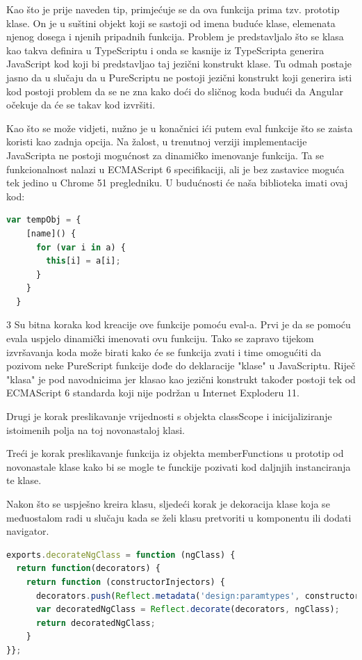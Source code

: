 \documentclass[times, utf8, zavrsni]{fer}
\begin{document}
Kao što je prije naveden tip, primjećuje se da ova funkcija prima tzv. prototip klase. On je u suštini objekt koji se sastoji od imena buduće klase, elemenata njenog dosega i njenih pripadnih funkcija. Problem je predstavljalo što se klasa kao takva definira u TypeScriptu i onda se kasnije iz TypeScripta generira JavaScript kod koji bi predstavljao taj jezični konstrukt klase. Tu odmah postaje jasno da u slučaju da u PureScriptu ne postoji jezični konstrukt koji generira isti kod postoji problem da se ne zna kako doći do sličnog koda budući da Angular očekuje da će se takav kod izvršiti.

Kao što se može vidjeti, nužno je u konačnici ići putem eval funkcije što se zaista koristi kao zadnja opcija. Na žalost, u trenutnoj verziji implementacije JavaScripta ne postoji mogućnost za dinamičko imenovanje funkcija. Ta se funkcionalnost nalazi u ECMAScript 6 specifikaciji, ali je bez zastavice moguća tek jedino u Chrome 51 pregledniku. U budućnosti će naša biblioteka imati ovaj kod:

\begin{lstlisting}[language=JavaScript, basicstyle=\small\linespread{0.8}]
var tempObj = {
    [name]() {
      for (var i in a) {
        this[i] = a[i];
      }
    }
  }
\end{lstlisting}

3 Su bitna koraka kod kreacije ove funkcije pomoću eval-a. Prvi je da se pomoću evala uspjelo dinamički imenovati ovu funkciju. Tako se zapravo tijekom izvršavanja koda može birati kako će se funkcija zvati i time omogućiti da pozivom neke PureScript funkcije dođe do deklaracije "klase" u JavaScriptu. Riječ "klasa" je pod navodnicima jer klasao kao jezični konstrukt također postoji tek od ECMAScript 6 standarda koji nije podržan u Internet Exploderu 11. 

Drugi je korak preslikavanje vrijednosti s objekta classScope i inicijaliziranje istoimenih polja na toj novonastaloj klasi.

Treći je korak preslikavanje funkcija iz objekta memberFunctions u prototip od novonastale klase kako bi se mogle te funckije pozivati kod daljnjih instanciranja te klase.

Nakon što se uspješno kreira klasu, sljedeći korak je dekoracija klase koja se međuostalom radi u slučaju kada se želi klasu pretvoriti u komponentu ili dodati navigator.

\begin{lstlisting}[language=JavaScript, basicstyle=\small\linespread{0.8}]
exports.decorateNgClass = function (ngClass) {
  return function(decorators) {
    return function (constructorInjectors) {
      decorators.push(Reflect.metadata('design:paramtypes', constructorInjectors || []));
      var decoratedNgClass = Reflect.decorate(decorators, ngClass);
      return decoratedNgClass;
    }
}};
\end{lstlisting}
\end{document}
